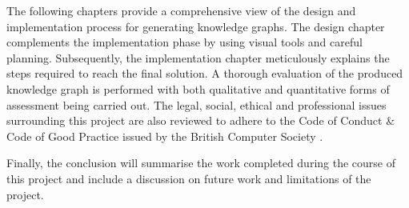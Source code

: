 The following chapters provide a comprehensive view of the design and implementation process for generating knowledge graphs. The design chapter complements the implementation phase by using visual tools and careful planning. Subsequently, the implementation chapter meticulously explains the steps required to reach the final solution. A thorough evaluation of the produced knowledge graph is performed with both qualitative and quantitative forms of assessment being carried out. The legal, social, ethical and professional issues surrounding this project are also reviewed to adhere to the Code of Conduct \& Code of Good Practice issued by the British Computer Society \cite{bcs}.

Finally, the conclusion will summarise the work completed during the course of this project and include a discussion on future work and limitations of the project.  

